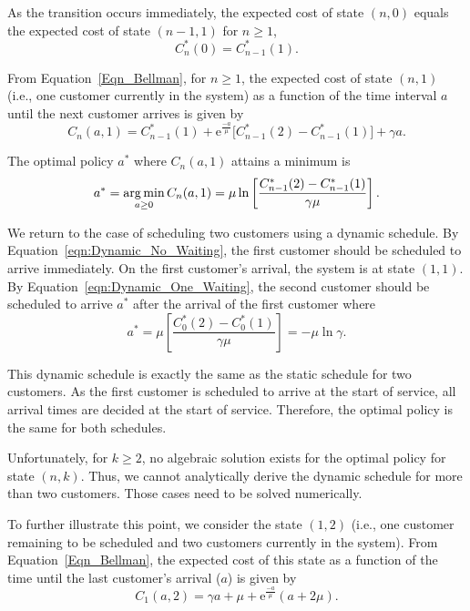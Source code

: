 As the transition occurs immediately, the expected cost of state $(n, 0)$ equals the expected cost of state $(n - 1, 1)$ for $n \geq 1$,
\begin{equation}
	C_{n}^{*} (0) = C_{n - 1}^{*} (1).
\end{equation}

From Equation~\ref{Eqn_Bellman}, for $n \geq 1$, the expected cost of state $(n, 1)$ (i.e., one customer currently in the system) as a function of the time interval $a$ until the next customer arrives is given by
\begin{equation}
	C_{n} (a, 1) = C_{n - 1}^{*} (1) + \mathrm{e}^{\frac{-a}{\mu}} \Big[ C_{n - 1}^{*} (2) - C_{n - 1}^{*} (1) \Big] + \gamma a.
\end{equation}

The optimal policy $a^{*}$ where $C_{n} (a, 1)$ attains a minimum is
\begin{equation}
	a^{*} = \operatorname*{arg\,min}_{a \geq 0} C_{n} (a, 1) = \mu \ln \left[ \frac{C_{n - 1}^{*} (2) - C_{n - 1}^{*} (1)}{\gamma \mu} \right].
	\label{eqn:Dynamic_One_Waiting}
\end{equation}

We return to the case of scheduling two customers using a dynamic schedule. By Equation~\ref{eqn:Dynamic_No_Waiting}, the first customer should be scheduled to arrive immediately. On the first customer's arrival, the system is at state $(1, 1)$. By Equation~\ref{eqn:Dynamic_One_Waiting}, the second customer should be scheduled to arrive $a^{*}$ after the arrival of the first customer where
\begin{equation}
	a^{*} = \mu \left[ \frac{C_{0}^{*} (2) - C_{0}^{*} (1)}{\gamma \mu} \right] = - \mu \ln \gamma.
\end{equation}

This dynamic schedule is exactly the same as the static schedule for two customers. As the first customer is scheduled to arrive at the start of service, all arrival times are decided at the start of service. Therefore, the optimal policy is the same for both schedules.

Unfortunately, for $k \geq 2$, no algebraic solution exists for the optimal policy for state $(n, k)$. Thus, we cannot analytically derive the dynamic schedule for more than two customers. Those cases need to be solved numerically.

To further illustrate this point, we consider the state $(1, 2)$ (i.e., one customer remaining to be scheduled and two customers currently in the system). From Equation~\ref{Eqn_Bellman}, the expected cost of this state as a function of the time until the last customer's arrival ($a$) is given by
\begin{equation}
	C_{1} (a, 2) = \gamma a + \mu + \mathrm{e}^{\frac{-a}{\mu}} (a + 2 \mu).
\end{equation}

